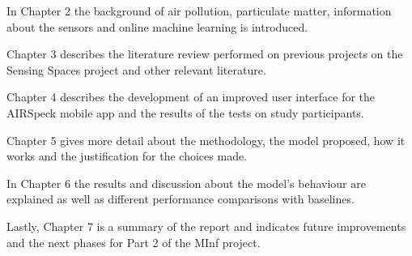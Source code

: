 In Chapter 2 the background of air pollution, particulate matter, information about the sensors and online machine learning is introduced.

Chapter 3 describes the literature review performed on previous projects on the Sensing Spaces project and other relevant literature.

Chapter 4 describes the development of an improved user interface for the AIRSpeck mobile app and the results of the tests on study participants.

Chapter 5 gives more detail about the methodology, the model proposed, how it works and the justification for the choices made.

In Chapter 6 the results and discussion about the model's behaviour are explained as well as different performance comparisons with baselines.

Lastly, Chapter 7 is a summary of the report and indicates future improvements and the next phases for Part 2 of the MInf project.
